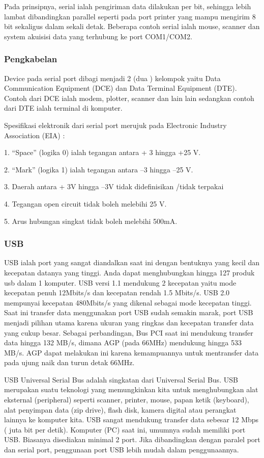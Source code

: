 Pada prinsipnya, serial ialah pengiriman data dilakukan per bit, sehingga lebih lambat dibandingkan parallel seperti pada port printer yang mampu mengirim 8 bit sekaligus dalam sekali detak. Beberapa contoh serial ialah mouse, scanner dan system akuisisi data yang terhubung ke port COM1/COM2.

\subsubsection{Pengkabelan}
Device pada serial port dibagi menjadi 2 (dua ) kelompok yaitu Data Communication Equipment (DCE) dan Data Terminal Equipment (DTE). Contoh dari DCE ialah modem, plotter, scanner dan lain lain sedangkan contoh dari DTE ialah terminal di komputer.

Spesifikasi elektronik dari serial port merujuk pada Electronic Industry Association (EIA) :

1. “Space” (logika 0) ialah tegangan antara + 3 hingga +25 V.

2. “Mark” (logika 1) ialah tegangan antara –3 hingga –25 V.

3. Daerah antara + 3V hingga –3V tidak didefinisikan /tidak terpakai

4. Tegangan open circuit tidak boleh melebihi 25 V.

5. Arus hubungan singkat tidak boleh melebihi 500mA.

\subsubsection{USB}
USB ialah port yang sangat diandalkan saat ini dengan bentuknya yang kecil dan kecepatan datanya yang tinggi. Anda dapat menghubungkan hingga 127 produk usb dalam 1 komputer. USB versi 1.1 mendukung 2 kecepatan yaitu mode kecepatan penuh 12Mbits/s dan kecepatan rendah 1.5 Mbits/s. USB 2.0 mempunyai kecepatan 480Mbits/s yang dikenal sebagai mode kecepatan tinggi. 
Saat ini transfer data menggunakan port USB sudah semakin marak, port USB menjadi pilihan utama karena ukuran yang ringkas dan kecepatan transfer data yang cukup besar.  Sebagai perbandingan, Bus  PCI saat ini mendukung transfer data hingga 132 MB/s, dimana AGP (pada 66MHz) mendukung hingga 533 MB/s. AGP  dapat melakukan ini karena kemampuannya untuk mentransfer data pada ujung naik dan turun detak 66MHz.

USB Universal Serial Bus adalah singkatan dari Universal Serial Bus. USB merupakan suatu teknologi yang memungkinkan kita untuk menghubungkan alat eksternal (peripheral) seperti scanner, printer, mouse, papan ketik (keyboard), alat penyimpan data (zip drive), flash disk, kamera digital atau perangkat lainnya ke komputer kita. USB sangat mendukung transfer data sebesar 12 Mbps ( juta bit per detik). Komputer (PC) saat ini, umumnya sudah memiliki port USB. Biasanya disediakan minimal 2 port. Jika dibandingkan dengan paralel port dan serial port, penggunaan port USB lebih mudah dalam penggunaannya.


